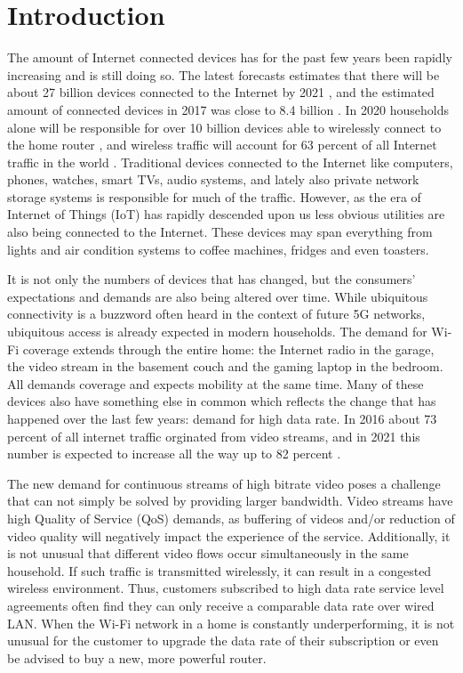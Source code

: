 \chapter{Introduction}
The amount of Internet connected devices has for the past few years been rapidly increasing and is still doing so. The latest forecasts
estimates that there will be about 27 billion devices connected to the Internet by 2021 \cite{CiscoVNI2017}, and the estimated amount of 
connected devices in 2017 was close to 8.4 billion \cite{Gartner}. In 2020 households alone will be responsible for over 10 billion devices
able to wirelessly connect to the home router \cite{wifialliance}, and wireless traffic will account for 63 percent of all Internet traffic in the world \cite{CiscoVNI2017}. 
Traditional devices connected to the Internet like computers, phones, watches, smart TVs, audio systems, and lately also private network storage systems is responsible
for much of the traffic. However, as the era of Internet of Things (IoT) has rapidly descended upon us less obvious utilities are also being connected to the Internet.
These devices may span everything from lights and air condition systems to coffee machines, fridges and even toasters.

It is not only the numbers of devices that has changed, but the consumers' expectations and demands are also being altered over time. 
While ubiquitous connectivity is a buzzword often heard in the context of future 5G networks, ubiquitous access is already expected in
modern households. The demand for Wi-Fi coverage extends through the entire home: the Internet radio in the garage, the video stream in the basement
couch and the gaming laptop in the bedroom. All demands coverage and expects mobility at the same time. Many of these devices also have something else in
common which reflects the change that has happened over the last few years: demand for high data rate. In 2016 about 73 percent of all internet traffic orginated from video
streams, and in 2021 this number is expected to increase all the way up to 82 percent \cite{CiscoVNI2017}. 


The new demand for continuous streams of high bitrate video poses a challenge that can not simply be solved by providing larger bandwidth. Video streams
have high Quality of Service (QoS) demands, as buffering of videos and/or reduction of video quality will negatively impact the experience of the service.
Additionally, it is not unusual that different video flows occur simultaneously in the same household. If such traffic is transmitted wirelessly,
it can result in a congested wireless environment. Thus, customers subscribed to high data rate service level agreements often find they can only receive a comparable data rate over wired LAN.
When the Wi-Fi network in a home is constantly underperforming, it is not unusual for the customer to upgrade the data rate of their subscription or even be advised to buy a new, more powerful router. 

